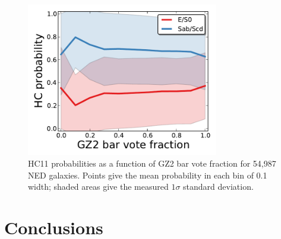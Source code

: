 \documentclass[useAMS,usenatbib]{mn2e}
\begin{document}
\begin{figure}
\includegraphics[angle=0,width=3.3in]{figures/hc_gz2_bar.pdf}
\caption{HC11 probabilities as a function of GZ2 bar vote fraction for 54,987 NED galaxies. Points give the mean probability in each bin of 0.1 width; shaded areas give the measured $1\sigma$ standard deviation. 
\label{fig-hc_gz2_bar}}
\end{figure}

%


%


\section{Conclusions}\label{sec-conclusion}
\end{document}
